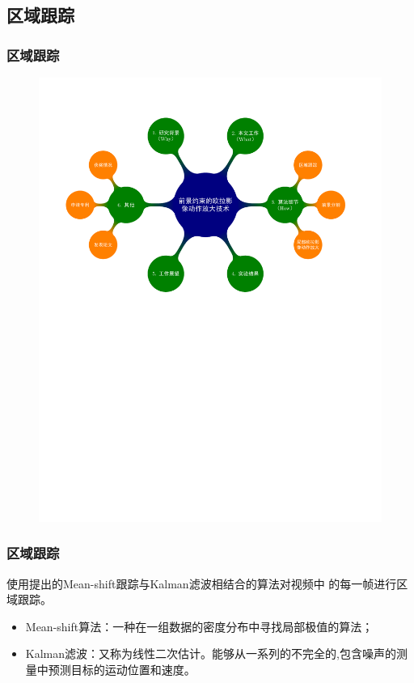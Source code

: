 \documentclass[xcolor=svgnames,serif,table,10pt]{beamer}
\begin{document}
\subsection{区域跟踪}

\begin{frame}
  \frametitle{区域跟踪}
  \vspace{-2.5em}
  \begin{figure}
    \centering
    \includegraphics[width=\textwidth, page=5]{mindmap.pdf}
  \end{figure}
\end{frame}

\begin{frame}
  \frametitle{区域跟踪}
  使用\cite{常发亮2007}提出的Mean-shift跟踪与Kalman滤波相结合的算法对视频中
  的每一帧进行区域跟踪。

  \begin{itemize}
  \item Mean-shift算法：一种在一组数据的密度分布中寻找局部极值的算法；
  \item Kalman滤波：又称为线性二次估计。能够从一系列的不完全的,包含噪声的测量中预测目标的运动位置和速度。
  \end{itemize}
\end{frame}
\end{document}

